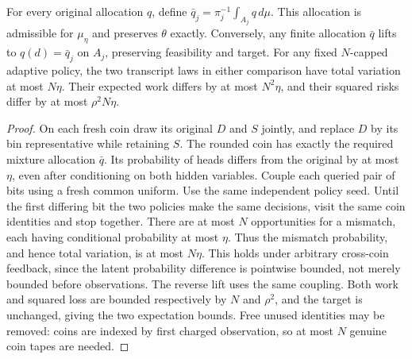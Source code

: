 \begin{lemma}
For every original allocation $q$, define
$\bar q_j=\pi_j^{-1}\int_{A_j}q\,d\mu$. This allocation is admissible for
$\mu_\eta$ and preserves $\theta$ exactly. Conversely, any finite allocation
$\bar q$ lifts to $q(d)=\bar q_j$ on $A_j$, preserving feasibility and target.
For any fixed $N$-capped adaptive policy, the two transcript laws in either
comparison have total variation at most $N\eta$. Their expected work differs
by at most $N^2\eta$, and their squared risks differ by at most $\rho^2N\eta$.
\end{lemma}
\begin{proof}
On each fresh coin draw its original $D$ and $S$ jointly, and replace $D$
by its bin representative while retaining $S$. The rounded coin has exactly
the required mixture allocation $\bar q$. Its probability of heads differs
from the original by at most $\eta$, even after conditioning on both hidden
variables. Couple each queried pair of bits using a fresh common uniform.
Use the same independent policy seed. Until the first differing bit the two
policies make the same decisions, visit the same coin identities and stop
together. There are at most $N$ opportunities for a mismatch, each having
conditional probability at most $\eta$. Thus the mismatch probability, and
hence total variation, is at most $N\eta$. This holds under arbitrary
cross-coin feedback, since the latent probability difference is pointwise
bounded, not merely bounded before observations. The reverse lift uses the
same coupling. Both work and squared loss are bounded respectively by $N$
and $\rho^2$, and the target is unchanged, giving the two expectation bounds.
Free unused identities may be removed: coins are indexed by first charged
observation, so at most $N$ genuine coin tapes are needed.
\end{proof}

